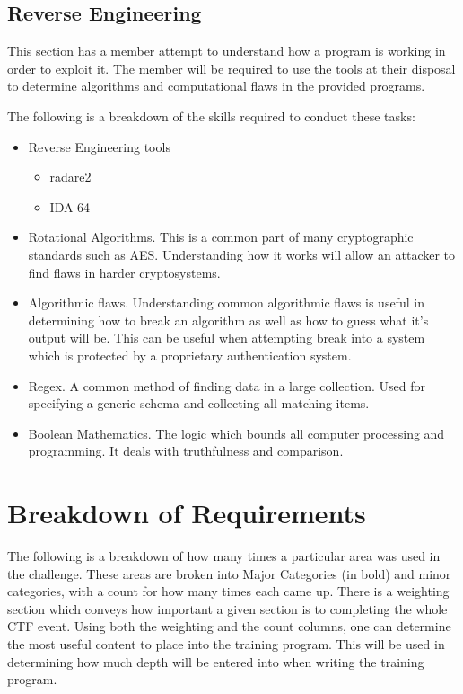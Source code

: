 \documentclass[a4paper,11pt]{report}
\begin{document}
		\subsection{Reverse Engineering}
			This section has a member attempt to understand how a program is working in order to exploit it. 
			The member will be required to use the tools at their disposal to determine algorithms and computational flaws in the provided programs. 

			The following is a breakdown of the skills required to conduct these tasks:
			\begin{itemize}
				\item Reverse Engineering tools
					\begin{itemize}
						\item radare2
						\item IDA 64
					\end{itemize}
				\item Rotational Algorithms.
					This is a common part of many cryptographic standards such as AES. 
					Understanding how it works will allow an attacker to find flaws in harder cryptosystems.
				\item Algorithmic flaws. 
					Understanding common algorithmic flaws is useful in determining how to break an algorithm as well as how to guess what it's output will be. 
					This can be useful when attempting break into a system which is protected by a proprietary authentication system. 
				\item Regex.
					A common method of finding data in a large collection. 
					Used for specifying a generic schema and collecting all matching items. 
				\item Boolean Mathematics. 
					The logic which bounds all computer processing and programming. 
					It deals with truthfulness and comparison. 
			\end{itemize}
	
	\section{Breakdown of Requirements}
	 	The following is a breakdown of how many times a particular area was used in the challenge. 
		These areas are broken into Major Categories (in bold) and minor categories, with a count for how many times each came up. 
		There is a weighting section which conveys how important a given section is to completing the whole CTF event. 
		Using both the weighting and the count columns, one can determine the most useful content to place into the training program. 
		This will be used in determining how much depth will be entered into when writing the training program.
\end{document}
